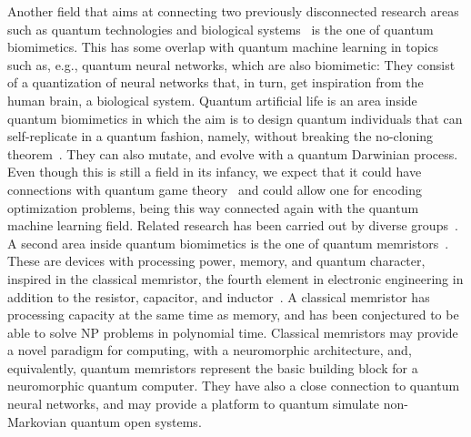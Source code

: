 \documentclass[12pt]{iopart}
\begin{document}
Another field that aims at connecting two previously disconnected research areas such as quantum technologies and biological systems~\cite{al1,alReview,al2} is the one of quantum biomimetics. This has some overlap with quantum machine learning in topics such as, e.g., quantum neural networks, which are also biomimetic: They consist of a quantization of neural networks that, in turn, get inspiration from the human brain, a biological system. Quantum artificial life is an area inside quantum biomimetics in which the aim is to design quantum individuals that can self-replicate in a quantum fashion, namely, without breaking the no-cloning theorem~\cite{qubiom1,qubiom2,qubiom3,WootersZurek}. They can also mutate, and evolve with a quantum Darwinian process. Even though this is still a field in its infancy, we expect that it could have connections with quantum game theory~\cite{EisertQG} and could allow one for encoding optimization problems, being this way connected again with the quantum machine learning field. Related research has been carried out by diverse groups~\cite{qe1,qe2,qe3,qe4}. A second area inside quantum biomimetics is the one of quantum memristors~\cite{qmem1,qmem2,qmem3,qmem4}. These are devices with processing power, memory, and quantum character, inspired in the classical memristor, the fourth element in electronic engineering in addition to the resistor, capacitor, and inductor~\cite{DiVentraMemristors}. A classical memristor has processing capacity at the same time as memory, and has been conjectured to be able to solve NP problems in polynomial time. Classical memristors may provide a novel paradigm for computing, with a neuromorphic architecture, and, equivalently, quantum memristors represent the basic building block for a neuromorphic quantum computer. They have also a close connection to quantum neural networks, and may provide a platform to quantum simulate non-Markovian quantum open systems.
\end{document}
